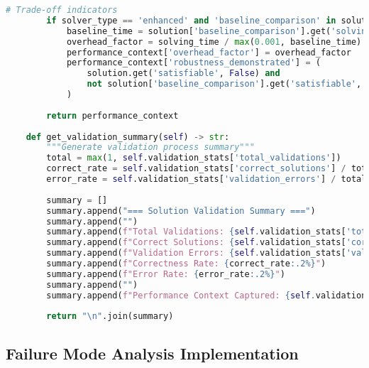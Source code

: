 \begin{lstlisting}[language=Python, caption=Independent Solution Validation with Trade-off Context]
        # Trade-off indicators
        if solver_type == 'enhanced' and 'baseline_comparison' in solution:
            baseline_time = solution['baseline_comparison'].get('solving_time', solving_time)
            overhead_factor = solving_time / max(0.001, baseline_time)
            performance_context['overhead_factor'] = overhead_factor
            performance_context['robustness_demonstrated'] = (
                solution.get('satisfiable', False) and 
                not solution['baseline_comparison'].get('satisfiable', True)
            )
        
        return performance_context
    
    def get_validation_summary(self) -> str:
        """Generate validation process summary"""
        total = max(1, self.validation_stats['total_validations'])
        correct_rate = self.validation_stats['correct_solutions'] / total
        error_rate = self.validation_stats['validation_errors'] / total
        
        summary = []
        summary.append("=== Solution Validation Summary ===")
        summary.append("")
        summary.append(f"Total Validations: {self.validation_stats['total_validations']}")
        summary.append(f"Correct Solutions: {self.validation_stats['correct_solutions']}")
        summary.append(f"Validation Errors: {self.validation_stats['validation_errors']}")
        summary.append(f"Correctness Rate: {correct_rate:.2%}")
        summary.append(f"Error Rate: {error_rate:.2%}")
        summary.append("")
        summary.append(f"Performance Context Captured: {self.validation_stats['performance_context_captured']}")
        
        return "\n".join(summary)
\end{lstlisting}

\subsection{Failure Mode Analysis Implementation}
\label{appendix:failure-analysis}

